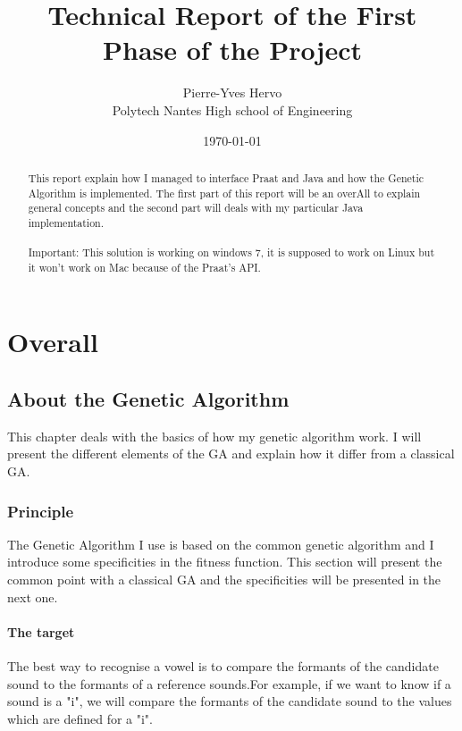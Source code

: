 \documentclass[12pt]{report}
\title{Technical Report of the First Phase of the Project}
\author{Pierre-Yves Hervo \\Polytech Nantes High school of Engineering }
\date{\today}
\begin{document}
\maketitle

\begin{abstract}
This report explain how I managed to interface Praat and Java and how the Genetic Algorithm is implemented. The first part of this report will be an overAll to explain general concepts and the second part will deals with my particular Java implementation.

\paragraph*{}
Important: This solution is working on windows 7, it is supposed to work on Linux but it won't work on Mac because of the Praat's API.

\end{abstract}

\tableofcontents

\part{Overall}

\chapter{About the Genetic Algorithm}
This chapter deals with the basics of how my genetic algorithm work. I will present the different elements of the GA and explain how it differ from a classical GA.

\section{Principle}
The Genetic Algorithm I use is based on the common genetic algorithm and I introduce some specificities in the fitness function. This section will present the common point with a classical GA and the specificities will be presented in the next one.

\subsection{The target}
The best way to recognise a vowel is to compare the formants of the candidate sound to the formants of a reference sounds.For example, if we want to know if a sound is a "i", we will compare the formants of the candidate sound to the values which are defined for a "i".
\end{document}
